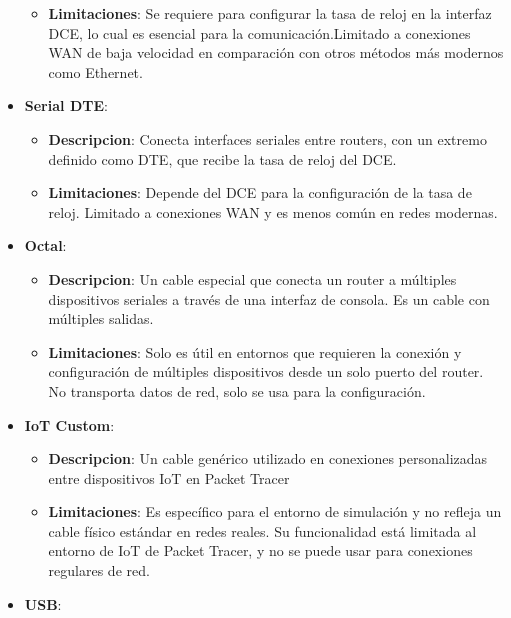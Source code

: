 \documentclass{article}
\begin{document}
\begin{itemize}
\begin{itemize}
                    \item\textbf{Limitaciones}:
                    Se requiere para configurar la tasa de reloj en la interfaz DCE, lo cual es esencial para la comunicación.Limitado a conexiones WAN de baja velocidad en comparación con otros métodos más modernos como Ethernet.
                \end{itemize} 
            \item\textbf{Serial DTE}: 
                \begin{itemize}
                    \item\textbf{Descripcion}:
                    Conecta interfaces seriales entre routers, con un extremo definido como DTE, que recibe la tasa de reloj del DCE.
                    \item\textbf{Limitaciones}:
                    Depende del DCE para la configuración de la tasa de reloj. Limitado a conexiones WAN y es menos común en redes modernas.
                \end{itemize} 
            \item\textbf{Octal}: 
                \begin{itemize}
                    \item\textbf{Descripcion}:
                    Un cable especial que conecta un router a múltiples dispositivos seriales a través de una interfaz de consola. Es un cable con múltiples salidas.
                    \item\textbf{Limitaciones}:
                    Solo es útil en entornos que requieren la conexión y configuración de múltiples dispositivos desde un solo puerto del router. No transporta datos de red, solo se usa para la configuración.
                \end{itemize} 
            \item\textbf{IoT Custom}:
                \begin{itemize}
                    \item\textbf{Descripcion}:
                    Un cable genérico utilizado en conexiones personalizadas entre dispositivos IoT en Packet Tracer
                    \item\textbf{Limitaciones}:
                    Es específico para el entorno de simulación y no refleja un cable físico estándar en redes reales. Su funcionalidad está limitada al entorno de IoT de Packet Tracer, y no se puede usar para conexiones regulares de red.
                \end{itemize} 
            \item\textbf{USB}: 

\end{itemize}
\end{document}
